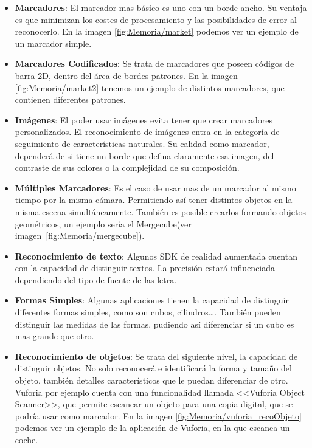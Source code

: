 \begin{itemize}
	\item \textbf{Marcadores}: El marcador mas básico es uno con un borde ancho. Su ventaja es que minimizan los costes de procesamiento y las posibilidades de error al reconocerlo. En la imagen \ref{fig:Memoria/market} podemos ver un ejemplo de un marcador simple.\\		
	\item \textbf{Marcadores Codificados}:
	Se trata de marcadores que poseen códigos de barra 2D, dentro del área de bordes patrones. En la imagen \ref{fig:Memoria/market2} tenemos un ejemplo de distintos marcadores, que contienen diferentes patrones.
	\item \textbf{Imágenes}:		
	El poder usar imágenes evita tener que crear marcadores personalizados. El reconocimiento de imágenes entra en la categoría de seguimiento de características naturales. Su calidad como marcador, dependerá de si tiene un borde que defina claramente esa imagen, del contraste de sus colores o la complejidad de su composición.
	\item \textbf{Múltiples Marcadores}:
	Es el caso de usar mas de un marcador al mismo tiempo por la misma cámara. Permitiendo así tener distintos objetos en la misma escena simultáneamente. También es posible crearlos formando objetos geométricos, un ejemplo sería el Mergecube(ver imagen~\ref{fig:Memoria/mergecube}).
	\item \textbf{Reconocimiento de texto}:
	Algunos SDK de realidad aumentada cuentan con la capacidad de distinguir textos. La precisión estará influenciada dependiendo del tipo de fuente de las letra. 
	\item \textbf{Formas Simples}:
	Algunas aplicaciones tienen la capacidad de distinguir diferentes formas simples, como son cubos, cilindros\dots. También pueden distinguir las medidas de las formas, pudiendo así diferenciar si un cubo es mas grande que otro.
	\item \textbf{Reconocimiento de objetos}:		
	Se trata del siguiente nivel, la capacidad de distinguir objetos. No solo reconocerá e identificará la forma y tamaño del objeto, también detalles característicos que le puedan diferenciar de otro. Vuforia por ejemplo cuenta con una funcionalidad llamada <<Vuforia Object Scanner>>, que permite escanear un objeto para una copia digital, que se podría usar como marcador. En la imagen \ref{fig:Memoria/vuforia_recoObjeto} podemos ver un ejemplo de la aplicación de Vuforia, en la que escanea un coche.  
	
\end{itemize}

